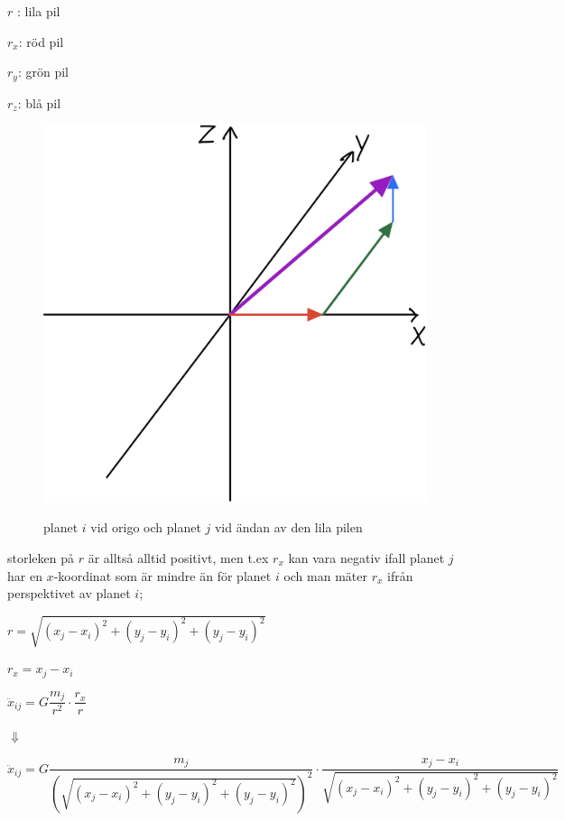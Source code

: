 \documentclass[10pt, a4paper]{amsart}
\begin{document}
\bigskip
\hspace{5ex}
$ r $ : lila pil
\bigskip

\hspace{5ex}
$ r_x $: röd pil

\hspace{5ex}
$ r_y $: grön pil

\hspace{5ex}
$ r_z $: blå pil

\begin{figure}[H]
    \includegraphics[width=50ex]{photos/chapter2/5.jpg}
    \centerline{planet $ i $ vid origo och planet $ j $ vid ändan av den lila pilen}
\end{figure}
\bigskip

storleken på $ r $ är alltså alltid positivt, men t.ex $ r_x $ kan vara negativ ifall planet $ j $ har en $ x $-koordinat som är mindre än för planet $ i $ och man mäter $ r_x $ ifrån perspektivet av planet $ i $;
\bigskip

\bigskip
\hspace{5ex}
$ r = \sqrt{(x_j - x_i)^2+(y_j - y_i)^2+(y_j - y_i)^2} $

\hspace{5ex}
$ r_x = x_j - x_i $
\bigskip

\bigskip
\hspace{5ex}
$ \ddot x_{ij} = G\dfrac{m_j}{r^2} \cdot \dfrac{r_x}{r} $
\bigskip

\hspace{10ex}
$ \Downarrow $
\bigskip

\hspace{5ex}
$ \ddot x_{ij} = G\dfrac{m_j}{(\sqrt{(x_j - x_i)^2+(y_j - y_i)^2+(y_j - y_i)^2})^2} \cdot \dfrac{x_j - x_i}{\sqrt{(x_j - x_i)^2+(y_j - y_i)^2+(y_j - y_i)^2}} $
\bigskip
\end{document}
